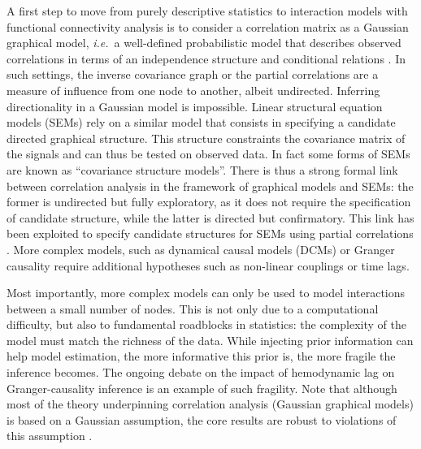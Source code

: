 \documentclass[5p]{elsarticle}
\begin{document}
A first step to move from purely descriptive statistics to interaction
models with
functional connectivity analysis is to consider a correlation matrix as a
Gaussian graphical model, \emph{i.e.}\ a well-defined probabilistic model
that describes observed correlations in terms of an independence
structure and conditional relations \cite{lauritzen1996,varoquaux2011}.
In such settings, the inverse covariance graph or the partial
correlations are a measure of influence from one node to another, albeit
undirected. Inferring directionality in a Gaussian model is impossible. Linear
structural equation models (SEMs) \cite{mcintosh1994} rely on a similar
model that consists in specifying a candidate directed graphical
structure. This structure constraints the covariance matrix of the
signals and can thus be tested on observed data. In fact some forms of
SEMs are known as ``covariance structure models''. There is thus a strong
formal link between correlation analysis in the framework of graphical
models and SEMs: the former is undirected but fully exploratory, as it
does not require the specification of candidate structure, while the
latter is directed but confirmatory. This link has been exploited to
specify candidate structures for SEMs using partial correlations
\cite{marrelec2007}. More complex models, such as dynamical causal models
(DCMs) \cite{friston2003a} or Granger causality \cite{goebel2003} require
additional hypotheses such as non-linear couplings or time lags.

Most importantly, more complex models can only be used to model
interactions between a small number of nodes. This is not only due to a
computational difficulty, but also to fundamental roadblocks in
statistics: the complexity of the model must match the richness of the
data. While injecting prior information can help model estimation, the
more informative this prior is, the more fragile the inference becomes. The
ongoing debate on the impact of hemodynamic lag on Granger-causality
inference \cite{smith2012a} is an example of such fragility.
Note that although most of the theory underpinning correlation analysis
(Gaussian graphical models) is based on a Gaussian assumption, the core results
are robust to violations of this assumption \cite{ravikumar2011}.
\end{document}
